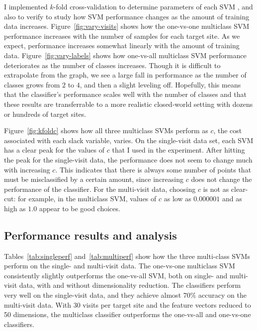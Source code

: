 \documentclass[10pt, twocolumn]{article}
\begin{document}
I implemented $k$-fold cross-validation to determine parameters of each SVM	, and also to verify to study how 
SVM performance changes as the amount of training data increases. Figure~\ref{fig:vary-visits} shows how the 
one-vs-one multiclass SVM performance increases with the number of samples for each target site. As we expect,
performance increases somewhat linearly with the amount of training data. Figure~\ref{fig:vary-labels} shows 
how one-vs-all multiclass SVM performance deteriorates as the number of classes increases. Though it is difficult 
to extrapolate from the graph, we see a large fall in performance as the number of classes grows from $2$ to $4$, 
and then a slight leveling off. Hopefully, this means that the classifier's performance scales well with the 
number of classes and that these results are transferrable to a more realistic closed-world setting with dozens or 
hundreds of target sites.

Figure~\ref{fig:kfoldc} shows how all three multiclass SVMs perform as $c$, the cost associated with each slack 
variable, varies. On the single-visit data set, each SVM has a clear peak for the values of $c$ that I used in the 
experiment. After hitting the peak for the single-visit data, the performance does not seem to change much with 
increasing $c$. This indicates that there is always some number of points that must be misclassified by a certain amount, 
since increasing $c$ does not change the performance of the classifier. For the multi-visit data, choosing $c$ is not 
as clear-cut: for example, in the multiclass SVM, values of $c$ as low as $0.000001$ and as high as $1.0$ appear to be 
good choices.


\subsection{Performance results and analysis}


Tables~\ref{tab:singleperf} and~\ref{tab:multiperf} show how the three multi-class SVMs perform on the single- and multi-visit data. 
The one-vs-one multiclass SVM consistently slightly outperforms the one-vs-all SVM, both on single- and multi-visit data, with and without dimensionality reduction. The classifiers perform very well on the single-visit data, and they achieve almost $70\%$ accuracy on 
the multi-visit data. With 30 visits per target site and the feature vectors reduced to 50 dimensions, the multiclass classifier
outperforms the one-vs-all and one-vs-one classifiers.
\end{document}
